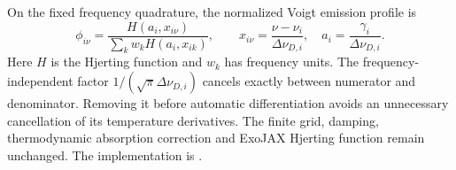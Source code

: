 \documentclass[10pt,a4paper]{article}
\begin{document}
On the fixed frequency quadrature, the normalized Voigt emission profile is
\begin{equation}
 \phi_{i\nu}=\frac{H(a_i,x_{i\nu})}
 {\sum_k w_k H(a_i,x_{ik})},\qquad
 x_{i\nu}=\frac{\nu-\nu_i}{\Delta\nu_{D,i}},\quad
 a_i=\frac{\gamma_i}{\Delta\nu_{D,i}}.
 \label{eq:line_profile_normalization}
\end{equation}
Here $H$ is the Hjerting function and $w_k$ has frequency units. The
frequency-independent factor $1/(\sqrt{\pi}\Delta\nu_{D,i})$ cancels
exactly between numerator and denominator. Removing it before automatic
differentiation avoids an unnecessary cancellation of its temperature
derivatives. The finite grid, damping, thermodynamic absorption correction
and ExoJAX Hjerting function remain unchanged. The implementation is
.
\end{document}

